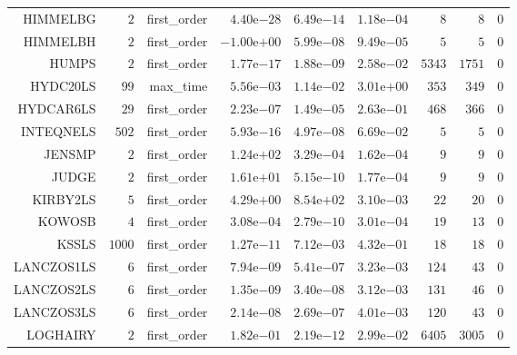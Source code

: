 \begin{longtable}{rrrrrrrrr}
HIMMELBG & \(     2\) & first\_order & \( 4.40\)e\(-28\) & \( 6.49\)e\(-14\) & \( 1.18\)e\(-04\) & \(     8\) & \(     8\) & \(     0\) \\
HIMMELBH & \(     2\) & first\_order & \(-1.00\)e\(+00\) & \( 5.99\)e\(-08\) & \( 9.49\)e\(-05\) & \(     5\) & \(     5\) & \(     0\) \\
HUMPS & \(     2\) & first\_order & \( 1.77\)e\(-17\) & \( 1.88\)e\(-09\) & \( 2.58\)e\(-02\) & \(  5343\) & \(  1751\) & \(     0\) \\
HYDC20LS & \(    99\) & max\_time & \( 5.56\)e\(-03\) & \( 1.14\)e\(-02\) & \( 3.01\)e\(+00\) & \(   353\) & \(   349\) & \(     0\) \\
HYDCAR6LS & \(    29\) & first\_order & \( 2.23\)e\(-07\) & \( 1.49\)e\(-05\) & \( 2.63\)e\(-01\) & \(   468\) & \(   366\) & \(     0\) \\
INTEQNELS & \(   502\) & first\_order & \( 5.93\)e\(-16\) & \( 4.97\)e\(-08\) & \( 6.69\)e\(-02\) & \(     5\) & \(     5\) & \(     0\) \\
JENSMP & \(     2\) & first\_order & \( 1.24\)e\(+02\) & \( 3.29\)e\(-04\) & \( 1.62\)e\(-04\) & \(     9\) & \(     9\) & \(     0\) \\
JUDGE & \(     2\) & first\_order & \( 1.61\)e\(+01\) & \( 5.15\)e\(-10\) & \( 1.77\)e\(-04\) & \(     9\) & \(     9\) & \(     0\) \\
KIRBY2LS & \(     5\) & first\_order & \( 4.29\)e\(+00\) & \( 8.54\)e\(+02\) & \( 3.10\)e\(-03\) & \(    22\) & \(    20\) & \(     0\) \\
KOWOSB & \(     4\) & first\_order & \( 3.08\)e\(-04\) & \( 2.79\)e\(-10\) & \( 3.01\)e\(-04\) & \(    19\) & \(    13\) & \(     0\) \\
KSSLS & \(  1000\) & first\_order & \( 1.27\)e\(-11\) & \( 7.12\)e\(-03\) & \( 4.32\)e\(-01\) & \(    18\) & \(    18\) & \(     0\) \\
LANCZOS1LS & \(     6\) & first\_order & \( 7.94\)e\(-09\) & \( 5.41\)e\(-07\) & \( 3.23\)e\(-03\) & \(   124\) & \(    43\) & \(     0\) \\
LANCZOS2LS & \(     6\) & first\_order & \( 1.35\)e\(-09\) & \( 3.40\)e\(-08\) & \( 3.12\)e\(-03\) & \(   131\) & \(    46\) & \(     0\) \\
LANCZOS3LS & \(     6\) & first\_order & \( 2.14\)e\(-08\) & \( 2.69\)e\(-07\) & \( 4.01\)e\(-03\) & \(   120\) & \(    43\) & \(     0\) \\
LOGHAIRY & \(     2\) & first\_order & \( 1.82\)e\(-01\) & \( 2.19\)e\(-12\) & \( 2.99\)e\(-02\) & \(  6405\) & \(  3005\) & \(     0\) \\

\end{longtable}
